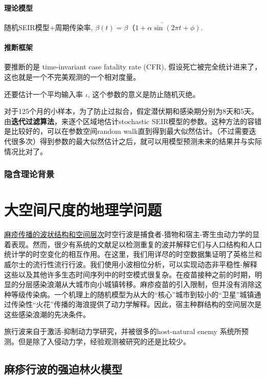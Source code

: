\paragraph{理论模型}

随机SEIR模型+周期传染率, $\beta(t) = \bar{\beta（1 + \alpha \sin(2\pi t +\phi)}$. 

\paragraph{推断框架}

要推断的是 time-invariant case fatality rate (CFR), 假设死亡被完全统计进来了，这也就是一个不完美观测的一个相对度量。

还要估计一个平均输入率 $\iota$, 这个参数的意义是防止随机灭绝。

对于125个月的小样本，为了防止过拟合，假定潜伏期和感染期分别为8天和5天。由\textbf{迭代过滤算法}，来逐个区域地估计stochastic SEIR模型的参数。这种方法的容错是比较好的，可以在参数空间random walk直到得到最大似然估计。（不过需要迭代很多次）得到参数的最大似然估计之后，就可以用模型预测未来的结果并与实际情况比对了。

\subsubsection{隐含理论背景}



\section{大空间尺度的地理学问题}

\href{https://www.nature.com/articles/414716a.pdf}{麻疹传播的波状结构和空间层次}时空行波是捕食者-猎物和宿主-寄生虫动力学的显着表现。然而，很少有系统的文献足以检测重复的波并解释它们与人口结构和人口统计学的时空变化的相互作用。在这里，我们用详尽的时空数据集证明了英格兰和威尔士的流行性流行行波。我们使用小波相位分析，可以实现动态非平稳性-解释这些以及其他许多生态时间序列中的时空模式很复杂。在疫苗接种之前的时期，明显的分层感染浪潮从大城市向小城镇转移。麻疹疫苗的引入限制，但并没有消除这种等级传染病。一个机理上的随机模型为从大的“核心”城市到较小的“卫星”城镇通过传染性“火花”传播的海浪提供了动力学解释。因此，宿主种群结构的空间层次是这些感染浪潮的先决条件。

旅行波来自于激活-抑制动力学研究，并被很多的host-natural enemy 系统所预测。但是除了入侵动力学，经验观测被研究的还是比较少。

\subsection{麻疹行波的强迫林火模型}



